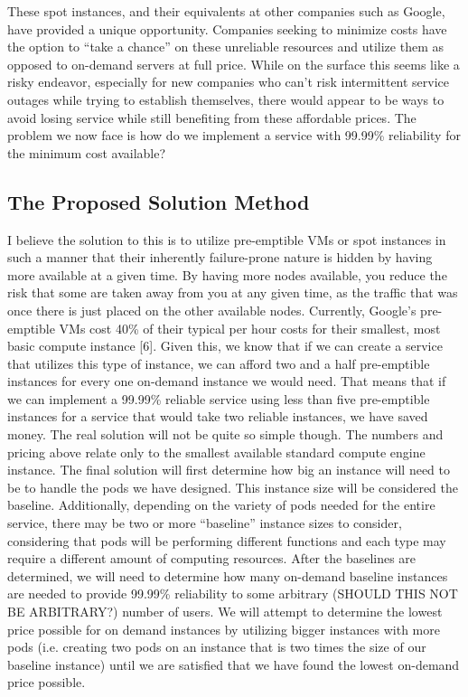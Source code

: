 \documentclass[thesis,proposal]{umassthesis}  %
\begin{document}
	These spot instances, and their equivalents at other companies such as Google, have provided a unique opportunity. Companies seeking to minimize costs have the option to “take a chance” on these unreliable resources and utilize them as opposed to on-demand servers at full price. While on the surface this seems like a risky endeavor, especially for new companies who can’t risk intermittent service outages while trying to establish themselves, there would appear to be ways to avoid losing service while still benefiting from these affordable prices. The problem we now face is how do we implement a service with 99.99\% reliability for the minimum cost available?

\subsection{The Proposed Solution Method}
I believe the solution to this is to utilize pre-emptible VMs or spot instances in such a manner that their inherently failure-prone nature is hidden by having more available at a given time. By having more nodes available, you reduce the risk that some are taken away from you at any given time, as the traffic that was once there is just placed on the other available nodes. Currently, Google’s pre-emptible VMs cost 40\% of their typical per hour costs for their smallest, most basic compute instance [6]. Given this, we know that if we can create a service that utilizes this type of instance, we can afford two and a half pre-emptible instances for every one on-demand instance we would need. That means that if we can implement a 99.99\% reliable service using less than five pre-emptible instances for a service that would take two reliable instances, we have saved money.
	The real solution will not be quite so simple though. The numbers and pricing above relate only to the smallest available standard compute engine instance. The final solution will first determine how big an instance will need to be to handle the pods we have designed. This instance size will be considered the baseline. Additionally, depending on the variety of pods needed for the entire service, there may be two or more “baseline” instance sizes to consider, considering that pods will be performing different functions and each type may require a different amount of computing resources. After the baselines are determined, we will need to determine how many on-demand baseline instances are needed to provide 99.99\% reliability to some arbitrary (SHOULD THIS NOT BE ARBITRARY?) number of users. We will attempt to determine the lowest price possible for on demand instances by utilizing bigger instances with more pods (i.e. creating two pods on an instance that is two times the size of our baseline instance) until we are satisfied that we have found the lowest on-demand price possible.
\end{document}
